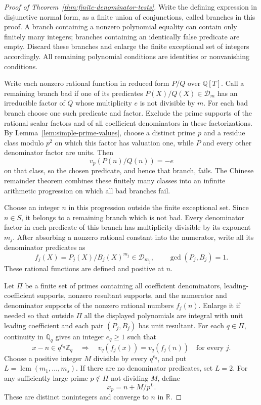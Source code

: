 \documentclass[11pt]{article}
\theoremstyle{definition}
\begin{document}
\begin{proof}[Proof of Theorem~\ref{thm:finite-denominator-tests}]
Write the defining expression in disjunctive normal form, as a finite
union of conjunctions, called branches in this proof.  A branch
containing a nonzero polynomial equality can contain only finitely
many integers; branches containing an identically false predicate
are empty.  Discard these branches and enlarge the finite exceptional
set of integers accordingly.  All remaining polynomial conditions
are identities or nonvanishing conditions.

Write each nonzero rational function in reduced form $P/Q$ over
$\mathbb Q[T]$.  Call a remaining branch bad if one of its predicates
$P(X)/Q(X)\in\mathcal D_m$ has an irreducible factor of $Q$ whose
multiplicity $e$ is not divisible by $m$.  For each bad branch choose
one such predicate and factor.  Exclude the prime supports of the
rational scalar factors and of all coefficient denominators in these
factorizations.  By
Lemma~\ref{lem:simple-prime-values}, choose a distinct prime $p$ and
a residue class modulo $p^2$ on which this factor has valuation one,
while $P$ and every other denominator factor are units.  Then
\[
                         v_p(P(n)/Q(n))=-e
\]
on that class, so the chosen predicate, and hence that branch, fails.
The Chinese remainder theorem combines these finitely many classes
into an infinite arithmetic progression on which all bad branches
fail.

Choose an integer $n$ in this progression outside the finite
exceptional set.  Since $n\in S$, it belongs to a remaining branch
which is not bad.  Every denominator factor in each predicate of
this branch has multiplicity divisible by its exponent $m_j$.
After absorbing a nonzero rational constant into the numerator,
write all its denominator predicates as
\[
              f_j(X)=P_j(X)/B_j(X)^{m_j}\in\mathcal D_{m_j},
              \qquad\gcd(P_j,B_j)=1.
\]
These rational functions are defined and positive at $n$.

Let $\Pi$ be a finite set of primes containing all coefficient
denominators, leading-coefficient supports, nonzero resultant
supports, and the numerator and denominator supports of the
nonzero rational numbers $f_j(n)$.  Enlarge it if needed so that
outside $\Pi$ all the displayed polynomials are integral with
unit leading coefficient and each pair $(P_j,B_j)$ has unit
resultant.  For each $q\in\Pi$, continuity in $\mathbb Q_q$
gives an integer $e_q\ge1$ such that
\[
 x-n\in q^{e_q}\mathbb Z_q
       \quad\Longrightarrow\quad
 v_q(f_j(x))=v_q(f_j(n))\quad\text{for every }j.
\]
Choose a positive integer $M$ divisible by every $q^{e_q}$,
and put $L=\operatorname{lcm}(m_1,\ldots,m_s)$.  If there are
no denominator predicates, set $L=2$.  For any sufficiently large
prime $p\notin\Pi$ not dividing $M$, define
\[
                              x_p=n+M/p^L.
\]
These are distinct nonintegers and converge to $n$ in $\mathbb R$.


\end{proof}
\end{document}
